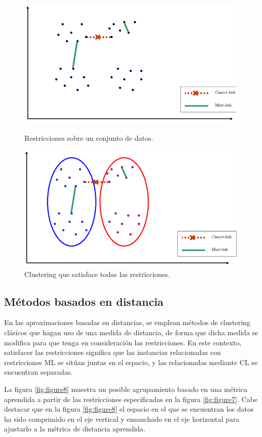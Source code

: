 \begin{figure}[bth]
	\myfloatalign
	{\includegraphics[width=.6\linewidth]{imagenes/c3/InputInstancesAndConst1}
	\caption[Restricciones sobre un conjunto de datos.]{Restricciones sobre un conjunto de datos. \cite{Survey:2007}} \label{fig:figure5}
	}
	{\includegraphics[width=.6\linewidth]{imagenes/c3/ClusteringSatAll}
	\caption[Clustering que satisface todas las restricciones.]{Clustering que satisface todas las restricciones. \cite{Survey:2007}} \label{fig:figure6}
	}
\end{figure}

\subsection{Métodos basados en distancia}

En las aproximaciones basadas en distancias, se emplean métodos de clustering clásicos que hagan uso de una medida de distancia, de forma que dicha medida se modifica para que tenga en consideración las restricciones. En este contexto, satisfacer las restricciones significa que las instancias relacionadas con restricciones \acf{ML} se sitúan juntas en el espacio, y las relacionadas mediante \acf{CL} se encuentran separadas.

La figura \ref{fig:figure8} muestra un posible agrupamiento basado en una métrica aprendida a partir de las restricciones especificadas en la figura \ref{fig:figure7}. Cabe destacar que en la figura \ref{fig:figure8} el espacio en el que se encuentran los datos ha sido comprimido en el eje vertical y ensanchado en el eje horizontal para ajustarlo a la métrica de distancia aprendida.

